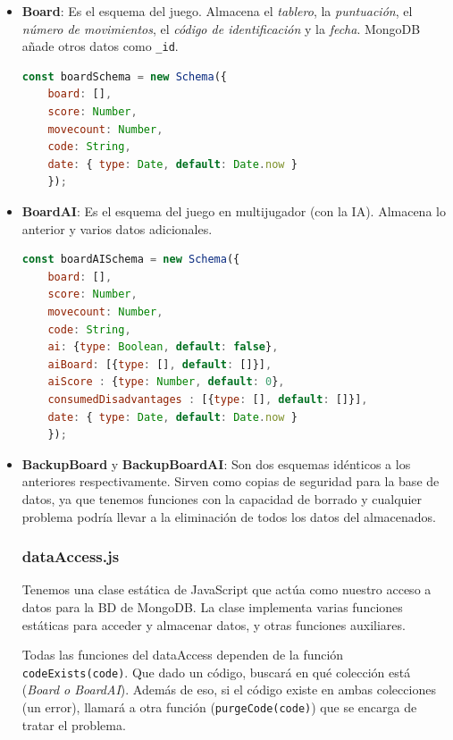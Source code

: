 \documentclass[12pt,epsf,titlepage,a4paper]{article}
\begin{document}
\begin{itemize}
    \item \textbf{Board}: Es el esquema del juego. Almacena el \textit{tablero}, la \textit{puntuación}, el \textit{número de movimientos}, el \textit{código de identificación} y la \textit{fecha}. MongoDB añade otros datos como \texttt{\_id}.
    \begin{lstlisting}[language=JavaScript]
    const boardSchema = new Schema({
    board: [],
    score: Number,
    movecount: Number,
    code: String,
    date: { type: Date, default: Date.now }
    });
    \end{lstlisting}

    \item \textbf{BoardAI}: Es el esquema del juego en multijugador (con la IA). Almacena lo anterior y varios datos adicionales.
    \begin{lstlisting}[language=JavaScript]
    const boardAISchema = new Schema({
    board: [],
    score: Number,
    movecount: Number,
    code: String,
    ai: {type: Boolean, default: false},
    aiBoard: [{type: [], default: []}],
    aiScore : {type: Number, default: 0},
    consumedDisadvantages : [{type: [], default: []}],
    date: { type: Date, default: Date.now }
    });
    \end{lstlisting}

    \item \textbf{BackupBoard} y \textbf{BackupBoardAI}: Son dos esquemas idénticos a los anteriores respectivamente. Sirven como copias de seguridad para la base de datos, ya que tenemos funciones con la capacidad de borrado y cualquier problema podría llevar a la eliminación de todos los datos del almacenados.

\subsubsection{dataAccess.js}

Tenemos una clase estática de JavaScript que actúa como nuestro acceso a datos para la BD de MongoDB. La clase implementa varias funciones estáticas para acceder y almacenar datos, y otras funciones auxiliares.

Todas las funciones del dataAccess dependen de la función \texttt{codeExists(code)}. Que dado un código, buscará en qué colección está (\textit{Board o BoardAI}). Además de eso, si el código existe en ambas colecciones (un error), llamará a otra función (\texttt{purgeCode(code)}) que se encarga de tratar el problema.


\end{itemize}
\end{document}
